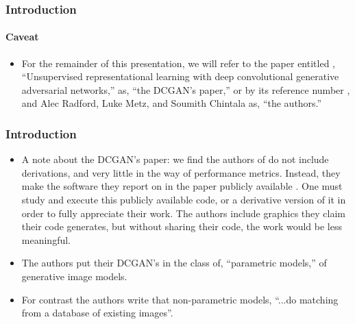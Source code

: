 \documentclass{beamer}
\begin{document}

\begin{frame}
\frametitle{Introduction}
\framesubtitle{Caveat}
\begin{itemize}
    \item For the remainder of this presentation, we will refer to the paper
entitled , ``Unsupervised representational learning with deep convolutional
generative adversarial networks,'' as,  ``the DCGAN's paper,'' or by its
reference number \cite{repLearnDcgan}, and Alec Radford,  Luke Metz, and Soumith 
Chintala as, ``the authors.''
\end{itemize}
\end{frame}


\begin{frame}
\frametitle{Introduction}
\begin{itemize}

\item A note about the DCGAN's paper: we find the authors of
\cite{repLearnDcgan} do not include derivations, and very little in the way
 of performance metrics.   Instead, they
  make the software they report on in the paper publicly available \cite{dcganCode}.
  One must study and execute this publicly available code, 
  or a derivative version of it in order to fully appreciate
  their work. The authors include graphics they claim their code generates, but
  without sharing their code, the work would be less meaningful.

\item The authors put their DCGAN's in the class of, ``parametric models,'' of
  generative image models.

\item For contrast the authors write that non-parametric models, ``...do
  matching  from a database of existing images''.

\end{itemize}

\end{frame}



\end{document}

